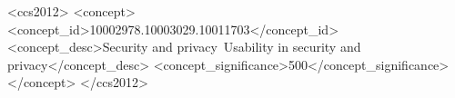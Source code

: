 \documentclass[sigconf, anonymous]{acmart}
\begin{document}

\begin{CCSXML}
<ccs2012>
<concept>
<concept_id>10002978.10003029.10011703</concept_id>
<concept_desc>Security and privacy~Usability in security and privacy</concept_desc>
<concept_significance>500</concept_significance>
</concept>
</ccs2012>
\end{CCSXML}





\maketitle





\end{document}
